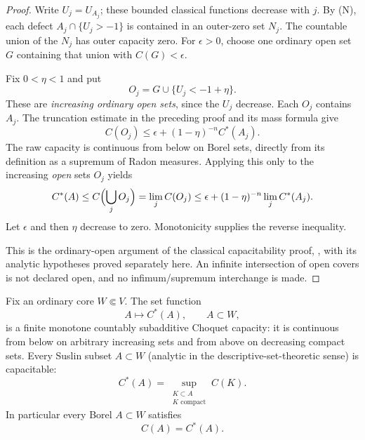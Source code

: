 \begin{proof}
Write $U_j=U_{A_j}$; these bounded classical functions decrease
with $j$. By \textup{(N)}, each defect
$A_j\cap\{U_j>-1\}$ is contained in an outer-zero set $N_j$.
The countable union of the $N_j$ has outer capacity zero.
For $\epsilon>0$, choose one ordinary open set $G$ containing
that union with $C(G)<\epsilon$.

Fix $0<\eta<1$ and put
\[
 O_j=G\cup\{U_j<-1+\eta\}.
\]
These are \emph{increasing ordinary open sets}, since the $U_j$
decrease. Each $O_j$ contains $A_j$. The truncation estimate in
the preceding proof and its mass formula give
\[
 C(O_j)\leq\epsilon+
      (1-\eta)^{-n}C^*(A_j).
\]
The raw capacity is continuous from below on Borel sets, directly
from its definition as a supremum of Radon measures. Applying
this only to the increasing \emph{open} sets $O_j$ yields
\[
 C^*(A)\leq C\Bigl(\bigcup_jO_j\Bigr)
       =\lim_j C(O_j)
       \leq\epsilon+(1-\eta)^{-n}\lim_j C^*(A_j).
\]
Let $\epsilon$ and then $\eta$ decrease to zero. Monotonicity
supplies the reverse inequality.

This is the ordinary-open argument of the classical capacitability
proof, \cite[\S8, Theorem 8.2]{BT82}, with its analytic hypotheses
proved separately here. An infinite intersection of open covers is
not declared open, and no infimum/supremum interchange is made.
\end{proof}

\begin{corollary}
\label{cor:r2-local-choquet}
Fix an ordinary core $W\Subset V$. The set function
\[
 A\longmapsto C^*(A),\qquad A\subset W,
\]
is a finite monotone countably subadditive Choquet capacity: it is
continuous from below on arbitrary increasing sets and from above
on decreasing compact sets. Every Suslin subset $A\subset W$
(analytic in the descriptive-set-theoretic sense) is capacitable:
\[
 C^*(A)=\sup_{\substack{K\subset A\\K\text{ compact}}}C(K).
\]
In particular every Borel $A\subset W$ satisfies
\[
 C(A)=C^*(A).
\]
\end{corollary}

